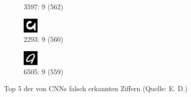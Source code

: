 \documentclass[a4paper,12pt,ngerman,oneside]{scrreprt}	%
\begin{document}
\begin{figure}[h]
\begin{subfigure}[t]{.19\linewidth}
				\caption{3597: 9 (562)}
			\end{subfigure}
			\begin{subfigure}[t]{.19\linewidth}
				\centering
				\includegraphics[height=0.6\linewidth]{top5CNN/9-2293.png}
				\caption{2293: 9 (560)}
			\end{subfigure}
			\begin{subfigure}[t]{.19\linewidth}
				\centering
				\includegraphics[height=0.6\linewidth]{top5CNN/9-6505.png}
				\caption{6505: 9 (559)}
			\end{subfigure}
			\vspace*{-2mm}
			\caption{Top 5 der von CNNs falsch erkannten Ziffern (Quelle: E. D.)}\label{top5CNN}
		\end{figure}
		\vspace*{-3mm}
\end{document}
